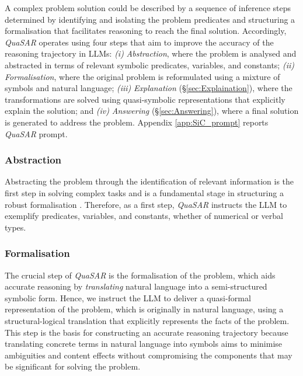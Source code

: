 \documentclass[11pt]{article}
\newcommand{\QuaSAR}{\emph{QuaSAR}\xspace}
\begin{document}
A complex problem solution could be described by a sequence of inference steps determined by identifying and isolating the problem predicates and structuring a formalisation that facilitates reasoning to reach the final solution.
Accordingly, \QuaSAR operates using four steps that aim to improve the accuracy of the reasoning trajectory in LLMs: \textit{(i)} \textit{Abstraction}, where the problem is analysed and abstracted in terms of relevant symbolic predicates, variables, and constants; \textit{(ii)} \textit{Formalisation}, where the original problem is reformulated using a mixture of symbols and natural language; \textit{(iii)} \textit{Explanation} (\S\ref{sec:Explaination}), where the transformations are solved using quasi-symbolic representations that explicitly explain the solution; and  \textit{(iv)} \textit{Answering} (\S\ref{sec:Answering}), where a final solution is generated to address the problem. Appendix \ref{app:SiC_prompt} reports \QuaSAR prompt.

\subsubsection{Abstraction}
\label{sec:Exemplification}
Abstracting the problem through the identification of relevant information is the first step in solving complex tasks and is a fundamental stage in structuring a robust formalisation \cite{Bronkhorst2019}. Therefore, as a first step, \QuaSAR instructs the LLM to exemplify predicates, variables, and constants, whether of numerical or verbal types.

\subsubsection{Formalisation}
\label{sec:Formalisation}
The crucial step of \QuaSAR is the formalisation of the problem, which aids accurate reasoning by \textit{translating} natural language into a semi-structured symbolic form. Hence, we instruct the LLM to deliver a quasi-formal representation of the problem, which is originally in natural language, using a structural-logical translation that explicitly represents the facts of the problem. This step is the basis for constructing an accurate reasoning trajectory because translating concrete terms in natural language into symbols aims to minimise ambiguities and content effects without compromising the components that may be significant for solving the problem.
\end{document}
